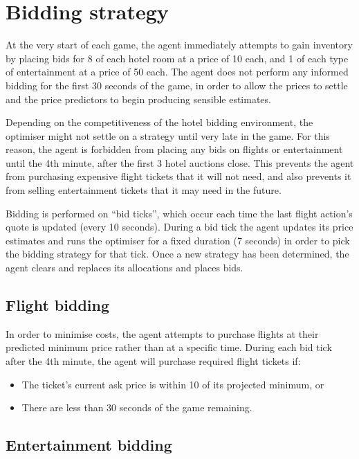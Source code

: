 \documentclass[a4paper]{proc}
\begin{document}
\section{Bidding strategy}

At the very start of each game, the agent immediately attempts to gain inventory by placing bids for 8 of each hotel room at a price of 10 each, and 1 of each type of entertainment at a price of 50 each. The agent does not perform any informed bidding for the first 30 seconds of the game, in order to allow the prices to settle and the price predictors to begin producing sensible estimates.

Depending on the competitiveness of the hotel bidding environment, the optimiser might not settle on a strategy until very late in the game. For this reason, the agent is forbidden from placing any bids on flights or entertainment until the 4th minute, after the first 3 hotel auctions close. This prevents the agent from purchasing expensive flight tickets that it will not need, and also prevents it from selling entertainment tickets that it may need in the future.

Bidding is performed on ``bid ticks'', which occur each time the last flight action's quote is updated (every 10 seconds). During a bid tick the agent updates its price estimates and runs the optimiser for a fixed duration (7 seconds) in order to pick the bidding strategy for that tick. Once a new strategy has been determined, the agent clears and replaces its allocations and places bids.

\subsection{Flight bidding}

In order to minimise costs, the agent attempts to purchase flights at their predicted minimum price rather than at a specific time. During each bid tick after the 4th minute, the agent will purchase required flight tickets if:

\begin{itemize}
  \item The ticket's current ask price is within 10 of its projected minimum, or
  \item There are less than 30 seconds of the game remaining.
\end{itemize}

\subsection{Entertainment bidding}
\end{document}
